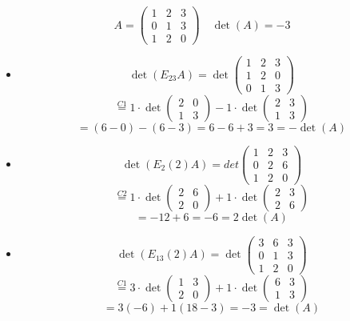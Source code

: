 \documentclass[a4paper]{article}
\theoremstyle{break}
\theoremstyle{break}
\theoremstyle{break}
\theoremstyle{break}
\begin{document}
  \begin{example}
    \[
    A = \begin{pmatrix} 
      1 & 2 & 3\\
      0 & 1 & 3\\
      1 & 2 & 0
    \end{pmatrix} 
    \quad
    \det(A) = -3
    \] 
    \begin{itemize}
      \item 
        \[
          \det(E_{23} A) = \det \begin{pmatrix} 
            1 & 2 & 3\\
            1 & 2 & 0\\
            0 & 1 & 3
          \end{pmatrix} 
        \] 
        \[
          \stackrel{C1}{=} 1 \cdot \det \begin{pmatrix} 
            2 & 0\\
            1 & 3
          \end{pmatrix}
          - 1 \cdot \det \begin{pmatrix} 
            2 & 3\\
            1 & 3
          \end{pmatrix}
        \] 
        \[
          = (6-0)-(6-3) = 6-6+3 = 3 = -\det(A)
        \] 
      \item 
        \[
        \det(E_2(2)A) = det \begin{pmatrix} 
          1 & 2 & 3\\
          0 & 2 & 6\\
          1 & 2 & 0
        \end{pmatrix}
        \] 
        \[
        \stackrel{C2}{=} 1 \cdot \det \begin{pmatrix} 
          2 & 6\\
          2 & 0
        \end{pmatrix}
        + 1 \cdot \det \begin{pmatrix} 
          2 & 3\\
          2 & 6
        \end{pmatrix}
        \] 
        \[
        = -12 + 6 = -6 = 2\det(A)
        \] 
      \item
        \[
          \det(E_{13}(2)A) = \det \begin{pmatrix} 
            3 & 6 & 3\\
            0 & 1 & 3\\
            1 & 2 & 0
          \end{pmatrix}
        \] 
        \[
        \stackrel{C1}{=} 3 \cdot \det \begin{pmatrix} 
          1 & 3\\
          2 & 0
        \end{pmatrix}
        + 1 \cdot \det \begin{pmatrix} 
          6 & 3\\
          1 & 3
        \end{pmatrix}
        \] 
        \[
        = 3(-6) + 1(18-3) = -3 = \det(A)
        \] 
    \end{itemize}
  \end{example}
\end{document}
